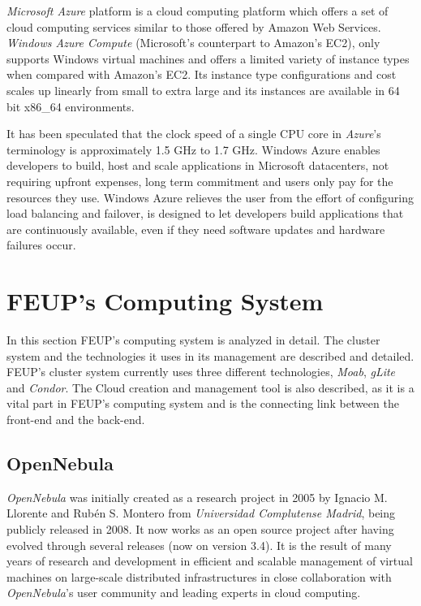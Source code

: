 \textit{Microsoft Azure} platform is a cloud computing platform which offers a set of cloud computing services similar to those offered by Amazon Web Services. \textit{Windows Azure Compute} (Microsoft's counterpart to Amazon's EC2), only supports Windows virtual machines and offers a limited variety of instance types when compared with Amazon's EC2. Its instance type configurations and cost scales up linearly from small to extra large and its instances are available in 64 bit x86\_64 environments. 

It has been speculated that the clock speed of a single CPU core in \textit{Azure}'s terminology is approximately 1.5 GHz to 1.7 GHz.\cite{azure-paper}
Windows Azure enables developers to build, host and scale applications in Microsoft datacenters, not requiring upfront expenses, long term commitment and users only pay for the resources they use. 
Windows Azure relieves the user from the effort of configuring load balancing and failover, is designed to let developers build applications that are continuously available, even if they need software updates and hardware failures occur.\cite{azure}

\clearpage
\section{FEUP's Computing System}\label{feup}

In this section FEUP's computing system is analyzed in detail. The cluster system and the technologies it uses in its management are described and detailed. FEUP's cluster system currently uses three different technologies, \textit{Moab}, \textit{gLite} and \textit{Condor}.
The Cloud creation and management tool is also described, as it is a vital part in FEUP's computing system and is the connecting link between the front-end and the back-end.

\subsection{OpenNebula}\label{subsec:opennebula}


\textit{OpenNebula} was initially created as a research project in 2005 by Ignacio M. Llorente and Rubén S. Montero from \textit{Universidad Complutense Madrid}, being publicly released in 2008. It now works as an open source project after having evolved through several releases (now on version 3.4). It is the result of many years of research and development in efficient and scalable management of virtual machines on large-scale distributed infrastructures in close collaboration with \textit{OpenNebula}'s user community and leading experts in cloud computing. 


